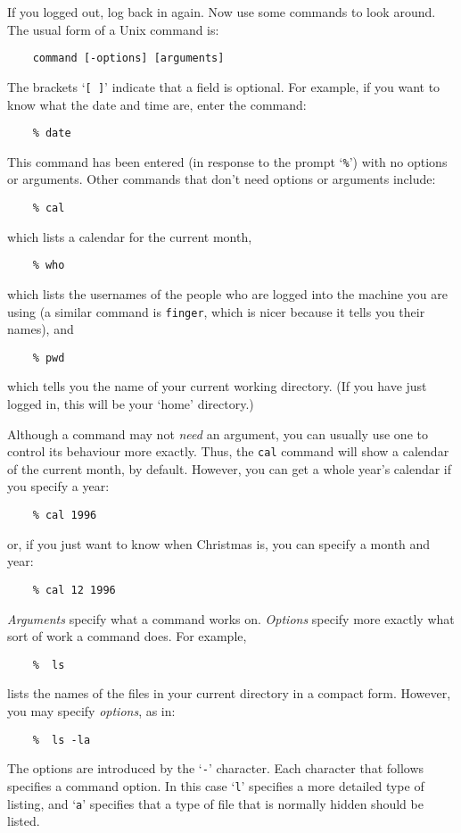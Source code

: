 If you logged out, log back in again.
Now use some commands to look around.
The usual form of a Unix command is:
\begin{verbatim}
    command [-options] [arguments]
\end{verbatim}
The brackets `{\tt [ ]}' indicate that a field is optional.
For example, if you want to know what the date and time are, enter the command:
\begin{verbatim}
    % date
\end{verbatim}
This command has been entered (in response to the prompt `{\tt \%}') with no
options or arguments.
Other commands that don't need options or arguments include:
\begin{verbatim}
    % cal
\end{verbatim}
which lists a calendar for the current month,
\begin{verbatim}
    % who
\end{verbatim}
which lists the usernames of the people who are logged into the machine you are
using (a similar command is {\tt finger}, which is nicer because it tells you
their names), and
\begin{verbatim}
    % pwd
\end{verbatim}
which tells you the name of your current working directory.
(If you have just logged in, this will be your `home' directory.)

Although a command may not {\em need}\/ an argument, you can usually use one to
control its behaviour more exactly.
Thus, the {\tt cal} command will show a calendar of the current month, by
default.
However, you can get a whole year's calendar if you specify a year:
\begin{verbatim}
    % cal 1996
\end{verbatim}
or, if you just want to know when Christmas is, you can specify a month and
year:
\begin{verbatim}
    % cal 12 1996
\end{verbatim}

{\em Arguments}\/ specify what a command works on.
{\em Options}\/ specify more exactly what sort of work a command does.
For example,
\begin{verbatim}
    %  ls
\end{verbatim}
lists the names of the files in your current directory in a compact form.
However, you may specify {\em options}, as in:
\begin{verbatim}
    %  ls -la
\end{verbatim}
The options are introduced by the `{\tt -}' character.
Each character that follows specifies a command option.
In this case `{\tt l}' specifies a more detailed type of listing, and `{\tt a}'
specifies that a type of file that is normally hidden should be listed.

